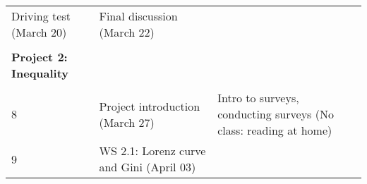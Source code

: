 \documentclass[
]{article}
\begin{document}
\begin{longtable}[]{@{}lll@{}}
\begin{minipage}[t]{0.38\columnwidth}
Driving test (March 20)\strut
\end{minipage} & \begin{minipage}[t]{0.36\columnwidth}\raggedright
Final discussion (March 22)\strut
\end{minipage}\tabularnewline
\begin{minipage}[t]{0.18\columnwidth}\raggedright
\strut
\end{minipage} & \begin{minipage}[t]{0.38\columnwidth}\raggedright
\strut
\end{minipage} & \begin{minipage}[t]{0.36\columnwidth}\raggedright
\strut
\end{minipage}\tabularnewline
\begin{minipage}[t]{0.18\columnwidth}\raggedright
\textbf{Project 2: Inequality}\strut
\end{minipage} & \begin{minipage}[t]{0.38\columnwidth}\raggedright
\strut
\end{minipage} & \begin{minipage}[t]{0.36\columnwidth}\raggedright
\strut
\end{minipage}\tabularnewline
\begin{minipage}[t]{0.18\columnwidth}\raggedright
\strut
\end{minipage} & \begin{minipage}[t]{0.38\columnwidth}\raggedright
\strut
\end{minipage} & \begin{minipage}[t]{0.36\columnwidth}\raggedright
\strut
\end{minipage}\tabularnewline
\begin{minipage}[t]{0.18\columnwidth}\raggedright
8\strut
\end{minipage} & \begin{minipage}[t]{0.38\columnwidth}\raggedright
Project introduction (March 27)\strut
\end{minipage} & \begin{minipage}[t]{0.36\columnwidth}\raggedright
Intro to surveys, conducting surveys (No class: reading at home)\strut
\end{minipage}\tabularnewline
\begin{minipage}[t]{0.18\columnwidth}\raggedright
9\strut
\end{minipage} & \begin{minipage}[t]{0.38\columnwidth}\raggedright
WS 2.1: Lorenz curve and Gini (April 03)\strut
\end{minipage} & \begin{minipage}[t]{0.36\columnwidth}\raggedright

\end{minipage}
\end{longtable}
\end{document}
